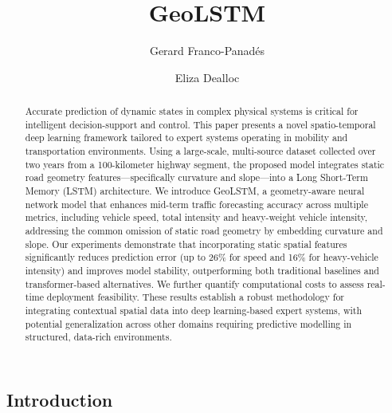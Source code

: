 \documentclass[
  letterpaper,
  DIV=11,
  numbers=noendperiod]{scrartcl}
\title{GeoLSTM}
\author{Gerard Franco-Panadés \and Eliza Dealloc}
\date{}
\renewcommand*\contentsname{Table of contents}
\newcommand\contentsname{Table of contents}
\begin{document}
\maketitle
\begin{abstract}
Accurate prediction of dynamic states in complex physical systems is
critical for intelligent decision-support and control. This paper
presents a novel spatio-temporal deep learning framework tailored to
expert systems operating in mobility and transportation environments.
Using a large-scale, multi-source dataset collected over two years from
a 100-kilometer highway segment, the proposed model integrates static
road geometry features---specifically curvature and slope---into a Long
Short-Term Memory (LSTM) architecture. We introduce GeoLSTM, a
geometry-aware neural network model that enhances mid-term traffic
forecasting accuracy across multiple metrics, including vehicle speed,
total intensity and heavy-weight vehicle intensity, addressing the
common omission of static road geometry by embedding curvature and
slope. Our experiments demonstrate that incorporating static spatial
features significantly reduces prediction error (up to 26\% for speed
and 16\% for heavy-vehicle intensity) and improves model stability,
outperforming both traditional baselines and transformer-based
alternatives. We further quantify computational costs to assess
real-time deployment feasibility. These results establish a robust
methodology for integrating contextual spatial data into deep
learning-based expert systems, with potential generalization across
other domains requiring predictive modelling in structured, data-rich
environments.
\end{abstract}

\renewcommand*\contentsname{Table of contents}
{
\hypersetup{linkcolor=}
\setcounter{tocdepth}{3}
\tableofcontents
}

\subsection{Introduction}\label{sec-intro}
\end{document}
